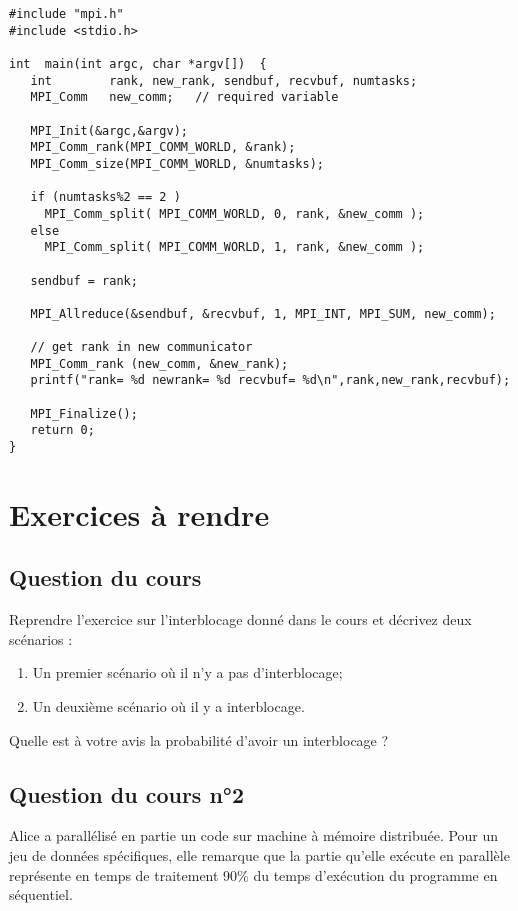 \documentclass[11pt,a4paper]{article}
\begin{document}
\begin{lstlisting}
#include "mpi.h"
#include <stdio.h>

int  main(int argc, char *argv[])  {
   int        rank, new_rank, sendbuf, recvbuf, numtasks;
   MPI_Comm   new_comm;   // required variable

   MPI_Init(&argc,&argv);
   MPI_Comm_rank(MPI_COMM_WORLD, &rank);
   MPI_Comm_size(MPI_COMM_WORLD, &numtasks);

   if (numtasks%2 == 2 )
     MPI_Comm_split( MPI_COMM_WORLD, 0, rank, &new_comm );
   else
     MPI_Comm_split( MPI_COMM_WORLD, 1, rank, &new_comm );

   sendbuf = rank;

   MPI_Allreduce(&sendbuf, &recvbuf, 1, MPI_INT, MPI_SUM, new_comm);

   // get rank in new communicator
   MPI_Comm_rank (new_comm, &new_rank);
   printf("rank= %d newrank= %d recvbuf= %d\n",rank,new_rank,recvbuf);

   MPI_Finalize();
   return 0;
}
\end{lstlisting}

\section{Exercices à rendre}

\subsection{Question du cours}

Reprendre l'exercice sur l'interblocage donné dans le cours et décrivez deux scénarios :
\begin{enumerate}
    \item Un premier scénario où il n'y a pas d'interblocage;
    \item Un deuxième scénario où il y a interblocage.
\end{enumerate}

Quelle est à votre avis la probabilité d'avoir un interblocage ?

\subsection{Question du cours n°2}

Alice a parallélisé en partie un code sur machine à mémoire distribuée. Pour un jeu de données spécifiques,
elle remarque que la partie qu'elle exécute en parallèle représente en temps de traitement 90\% du
temps d'exécution du programme en séquentiel.
\end{document}

